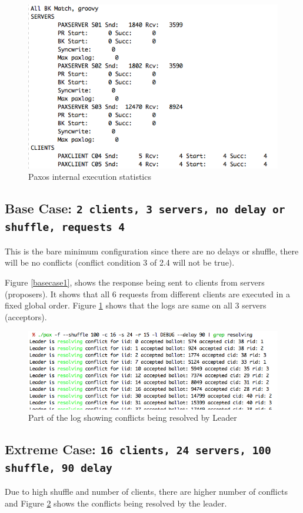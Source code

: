 \begin{figure}[ht!]
\centering
\includegraphics[width=160mm]{base_case2.png}
\caption{Paxos internal execution statistics}
\label{basecase2}
\end{figure}


\subsection{Base Case: \texttt{2 clients, 3 servers, no delay or shuffle, requests 4} }
This is the bare minimum configuration since there are no delays or shuffle, there will be no conflicts (conflict condition 3 of 2.4 will not be true). 

Figure \ref{basecase1}, shows the response being sent to clients from servers (proposers). It shows that all 6 requests from different clients are executed in a fixed global order. Figure \ref{basecase2} shows that the logs are same on all 3 servers (acceptors).

\begin{figure}[ht!]
\centering
\includegraphics[width=160mm]{conflicts.png}
\caption{Part of the log showing conflicts being resolved by Leader}
\label{conflicts}
\end{figure}


\subsection{Extreme Case: \texttt{16 clients, 24 servers, 100 shuffle, 90 delay } }
Due to high shuffle and number of clients, there are higher number of conflicts and Figure \ref{conflicts} shows the conflicts being resolved by the leader.

